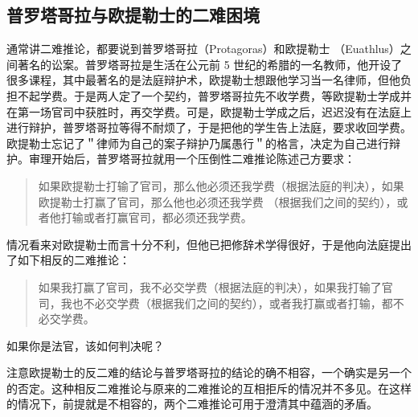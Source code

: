 \subsection{普罗塔哥拉与欧提勒士的二难困境}

通常讲二难推论，都要说到普罗塔哥拉（Protagoras）和欧提勒士 （Euathlus）之间著名的讼案。普罗塔哥拉是生活在公元前 5 世纪的希腊的一名教师，他开设了很多课程，其中最著名的是法庭辩护术，欧提勒士想跟他学习当一名律师，但他负担不起学费。于是两人定了一个契约，普罗塔哥拉先不收学费，等欧提勒士学成并在第一场官司中获胜时，再交学费。可是，欧提勒士学成之后，迟迟没有在法庭上进行辩护，普罗塔哥拉等得不耐烦了，于是把他的学生告上法庭，要求收回学费。欧提勒士忘记了＂律师为自己的案子辩护乃属愚行＂的格言，决定为自己进行辩护。审理开始后，普罗塔哥拉就用一个压倒性二难推论陈述己方要求：

\begin{quote}
如果欧提勒士打输了官司，那么他必须还我学费（根据法庭的判决），如果欧提勒士打赢了官司，那么他也必须还我学费 （根据我们之间的契约），或者他打输或者打赢官司，都必须还我学费。
\end{quote}

情况看来对欧提勒士而言十分不利，但他已把修辞术学得很好，于是他向法庭提出了如下相反的二难推论：

\begin{quote}
如果我打赢了官司，我不必交学费（根据法庭的判决），如果我打输了官司，我也不必交学费（根据我们之间的契约），或者我打赢或者打输，都不必交学费。
\end{quote}

如果你是法官，该如何判决呢？

注意欧提勒士的反二难的结论与普罗塔哥拉的结论的确不相容，一个确实是另一个的否定。这种相反二难推论与原来的二难推论的互相拒斥的情况并不多见。在这样的情况下，前提就是不相容的，两个二难推论可用于澄清其中蕴涵的矛盾。

